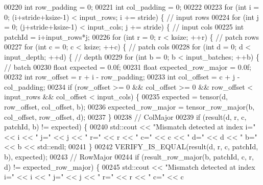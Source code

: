 \begin{DoxyCode}
00220   \textcolor{keywordtype}{int} row\_padding = 0;
00221   \textcolor{keywordtype}{int} col\_padding = 0;
00222 
00223   \textcolor{keywordflow}{for} (\textcolor{keywordtype}{int} i = 0; (i+stride+ksize-1) < input\_rows; i += stride) \{  \textcolor{comment}{// input rows}
00224     \textcolor{keywordflow}{for} (\textcolor{keywordtype}{int} j = 0; (j+stride+ksize-1) < input\_cols; j += stride) \{  \textcolor{comment}{// input cols}
00225       \textcolor{keywordtype}{int} patchId = i+input\_rows*j;
00226       \textcolor{keywordflow}{for} (\textcolor{keywordtype}{int} r = 0; r < ksize; ++r) \{  \textcolor{comment}{// patch rows}
00227         \textcolor{keywordflow}{for} (\textcolor{keywordtype}{int} c = 0; c < ksize; ++c) \{  \textcolor{comment}{// patch cols}
00228           \textcolor{keywordflow}{for} (\textcolor{keywordtype}{int} d = 0; d < input\_depth; ++d) \{  \textcolor{comment}{// depth}
00229             \textcolor{keywordflow}{for} (\textcolor{keywordtype}{int} b = 0; b < input\_batches; ++b) \{  \textcolor{comment}{// batch}
00230               \textcolor{keywordtype}{float} expected = 0.0f;
00231               \textcolor{keywordtype}{float} expected\_row\_major = 0.0f;
00232               \textcolor{keywordtype}{int} row\_offset = r + i - row\_padding;
00233               \textcolor{keywordtype}{int} col\_offset = c + j - col\_padding;
00234               \textcolor{keywordflow}{if} (row\_offset >= 0 && col\_offset >= 0 && row\_offset < input\_rows && col\_offset < input\_cols)
       \{
00235                 expected = tensor(d, row\_offset, col\_offset, b);
00236                 expected\_row\_major = tensor\_row\_major(b, col\_offset, row\_offset, d);
00237               \}
00238               \textcolor{comment}{// ColMajor}
00239               \textcolor{keywordflow}{if} (result(d, r, c, patchId, b) != expected) \{
00240                 std::cout << \textcolor{stringliteral}{"Mismatch detected at index i="} << i << \textcolor{stringliteral}{" j="} << j << \textcolor{stringliteral}{" r="} << r << \textcolor{stringliteral}{" c="} << c
       << \textcolor{stringliteral}{" d="} << d << \textcolor{stringliteral}{" b="} << b << std::endl;
00241               \}
00242               VERIFY\_IS\_EQUAL(result(d, r, c, patchId, b), expected);
00243               \textcolor{comment}{// RowMajor}
00244               \textcolor{keywordflow}{if} (result\_row\_major(b, patchId, c, r, d) != expected\_row\_major) \{
00245                 std::cout << \textcolor{stringliteral}{"Mismatch detected at index i="} << i << \textcolor{stringliteral}{" j="} << j << \textcolor{stringliteral}{" r="} << r << \textcolor{stringliteral}{" c="} << c

\end{DoxyCode}
